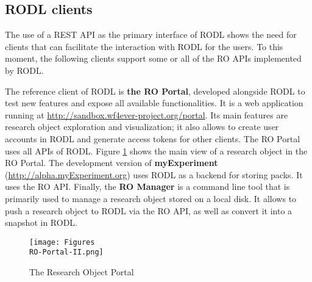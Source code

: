 \subsection{RODL clients}

The use of a REST API as the primary interface of RODL shows the need for clients that can facilitate the interaction with RODL for the users. To this moment, the following clients support some or all of the RO APIs implemented by RODL.

The reference client of RODL is \textbf{the RO Portal}, developed alongside RODL to test new features and expose all available functionalities. It is a web application running at \url{http://sandbox.wf4ever-project.org/portal}. Its main features are research object exploration and visualization; it also allows to create user accounts in RODL and generate access tokens for other clients. The RO Portal uses all APIs of RODL. Figure \ref{Portal} shows the main view of a research object in the RO Portal. The development version of \textbf{myExperiment} \cite{myExperiment} (\url{http://alpha.myExperiment.org}) uses RODL as a backend for storing packs. It uses the RO API. Finally, the \textbf{RO Manager} \cite{RO-Manager} is a command line tool that is primarily used to manage a research object stored on a local disk. It allows to push a research object to RODL via the RO API, as well as convert it into a snapshot in RODL.

\begin{figure}[!hb]
\centering
\texttt{[image: Figures\\RO-Portal-II.png]}
\caption{The Research Object Portal}
\label{Portal}
\end{figure}
